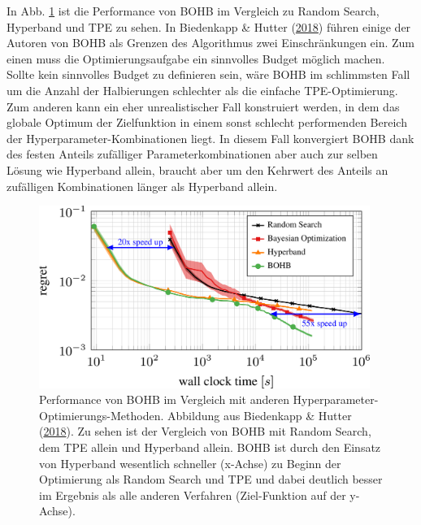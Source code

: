 \documentclass[
  12pt,
  openany]{book}
\begin{document}
In Abb. \ref{fig:bohb} ist die Performance von BOHB im Vergleich zu Random Search, Hyperband und TPE zu sehen. In Biedenkapp \& Hutter (\protect\hyperlink{ref-biedenkappAutoMLBOHBRobust2018}{2018}) führen einige der Autoren von BOHB als Grenzen des Algorithmus zwei Einschränkungen ein. Zum einen muss die Optimierungsaufgabe ein sinnvolles Budget möglich machen. Sollte kein sinnvolles Budget zu definieren sein, wäre BOHB im schlimmsten Fall um die Anzahl der Halbierungen schlechter als die einfache TPE-Optimierung.
Zum anderen kann ein eher unrealistischer Fall konstruiert werden, in dem das globale Optimum der Zielfunktion in einem sonst schlecht performenden Bereich der Hyperparameter-Kombinationen liegt. In diesem Fall konvergiert BOHB dank des festen Anteils zufälliger Parameterkombinationen aber auch zur selben Lösung wie Hyperband allein, braucht aber um den Kehrwert des Anteils an zufälligen Kombinationen länger als Hyperband allein.





\begin{figure}

{\centering \includegraphics[width=0.96\textwidth]{../imgs/bohb} 

}

\caption[Performance von BOHB.]{Performance von BOHB im Vergleich mit anderen Hyperparameter-Optimierungs-Methoden. Abbildung aus Biedenkapp \& Hutter (\protect\hyperlink{ref-biedenkappAutoMLBOHBRobust2018}{2018}). Zu sehen ist der Vergleich von BOHB mit Random Search, dem TPE allein und Hyperband allein. BOHB ist durch den Einsatz von Hyperband wesentlich schneller (x-Achse) zu Beginn der Optimierung als Random Search und TPE und dabei deutlich besser im Ergebnis als alle anderen Verfahren (Ziel-Funktion auf der y-Achse).}\label{fig:bohb}
\end{figure}
\end{document}
